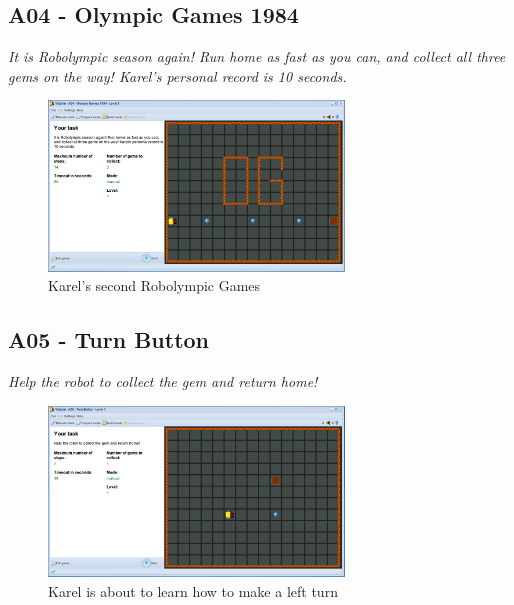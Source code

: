\documentclass[article,A4,12pt]{llncs}
\begin{document}
\subsection{A04 - Olympic Games 1984}

{\em It is Robolympic season again! Run home as fast as you can, 
and collect all three gems on the way! Karel's personal record is 10 seconds.}

\begin{figure}[!ht]
\begin{center}
\includegraphics[width=0.7\textwidth]{img/a04.png}
\end{center}
\vspace{-4mm}
\caption{Karel's second Robolympic Games}
\label{fig:a04}
\end{figure}
\noindent


\subsection{A05 - Turn Button}

{\em Help the robot to collect the gem and return home!}

\begin{figure}[!ht]
\begin{center}
\includegraphics[width=0.7\textwidth]{img/a05.png}
\end{center}
\vspace{-4mm}
\caption{Karel is about to learn how to make a left turn}
\label{fig:a05}
\vspace{-1cm}
\end{figure}
\noindent
\newpage
\end{document}
